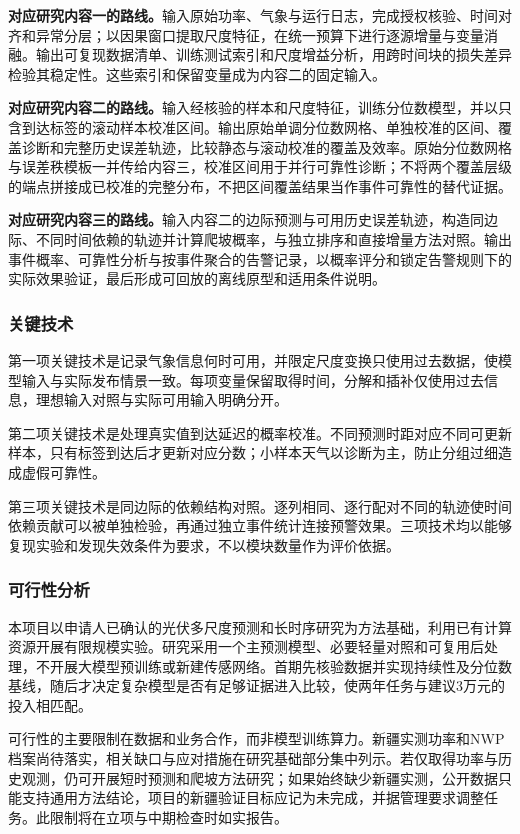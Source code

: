 \textbf{对应研究内容一的路线。}输入原始功率、气象与运行日志，完成授权核验、时间对齐和异常分层；以因果窗口提取尺度特征，在统一预算下进行逐源增量与变量消融。输出可复现数据清单、训练测试索引和尺度增益分析，用跨时间块的损失差异检验其稳定性。这些索引和保留变量成为内容二的固定输入。

\textbf{对应研究内容二的路线。}输入经核验的样本和尺度特征，训练分位数模型，并以只含到达标签的滚动样本校准区间。输出原始单调分位数网格、单独校准的区间、覆盖诊断和完整历史误差轨迹，比较静态与滚动校准的覆盖及效率。原始分位数网格与误差秩模板一并传给内容三，校准区间用于并行可靠性诊断；不将两个覆盖层级的端点拼接成已校准的完整分布，不把区间覆盖结果当作事件可靠性的替代证据。

\textbf{对应研究内容三的路线。}输入内容二的边际预测与可用历史误差轨迹，构造同边际、不同时间依赖的轨迹并计算爬坡概率，与独立排序和直接增量方法对照。输出事件概率、可靠性分析与按事件聚合的告警记录，以概率评分和锁定告警规则下的实际效果验证，最后形成可回放的离线原型和适用条件说明。

\subsubsection{关键技术}
第一项关键技术是记录气象信息何时可用，并限定尺度变换只使用过去数据，使模型输入与实际发布情景一致。每项变量保留取得时间，分解和插补仅使用过去信息，理想输入对照与实际可用输入明确分开。

第二项关键技术是处理真实值到达延迟的概率校准。不同预测时距对应不同可更新样本，只有标签到达后才更新对应分数；小样本天气以诊断为主，防止分组过细造成虚假可靠性。

第三项关键技术是同边际的依赖结构对照。逐列相同、逐行配对不同的轨迹使时间依赖贡献可以被单独检验，再通过独立事件统计连接预警效果。三项技术均以能够复现实验和发现失效条件为要求，不以模块数量作为评价依据。

\subsubsection{可行性分析}
本项目以申请人已确认的光伏多尺度预测和长时序研究为方法基础，利用已有计算资源开展有限规模实验。研究采用一个主预测模型、必要轻量对照和可复用后处理，不开展大模型预训练或新建传感网络。首期先核验数据并实现持续性及分位数基线，随后才决定复杂模型是否有足够证据进入比较，使两年任务与建议3万元的投入相匹配。

可行性的主要限制在数据和业务合作，而非模型训练算力。新疆实测功率和NWP档案尚待落实，相关缺口与应对措施在研究基础部分集中列示。若仅取得功率与历史观测，仍可开展短时预测和爬坡方法研究；如果始终缺少新疆实测，公开数据只能支持通用方法结论，项目的新疆验证目标应记为未完成，并据管理要求调整任务。此限制将在立项与中期检查时如实报告。
